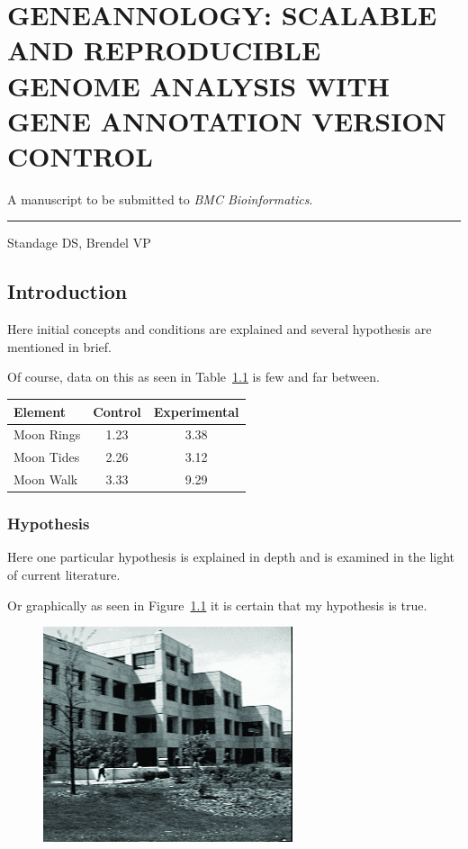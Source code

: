 \chapter{GENEANNOLOGY: SCALABLE AND REPRODUCIBLE GENOME ANALYSIS WITH GENE ANNOTATION VERSION CONTROL}

A manuscript to be submitted to \textit{BMC Bioinformatics}.

\noindent\hfil\rule{0.5\textwidth}{.4pt}\hfil

Standage DS, Brendel VP

\section{Introduction}

Here initial concepts and conditions are explained and
several hypothesis are mentioned in brief.

Of course, data on this as seen in Table~\ref{data}
is few and far between.

\begin{table}[h!tb] \centering
{}
\label{data}
\begin{tabular}{lcc} \hline
\textbf{Element} & \textbf{Control} & \textbf{Experimental} \\ \hline
Moon Rings & 1.23 & 3.38 \\
Moon Tides & 2.26 & 3.12 \\
Moon Walk & 3.33 & 9.29 \\ \hline
\end{tabular}
\end{table}

\subsection{Hypothesis}

Here one particular hypothesis is explained in depth
and is examined in the light of current literature.

Or graphically as seen in Figure~\ref{mgraph}
it is certain that my hypothesis is true.

\begin{figure}[h!tb] \centering

\includegraphics{Assets/Graphics/dc5}

\label{mgraph}
\end{figure}

